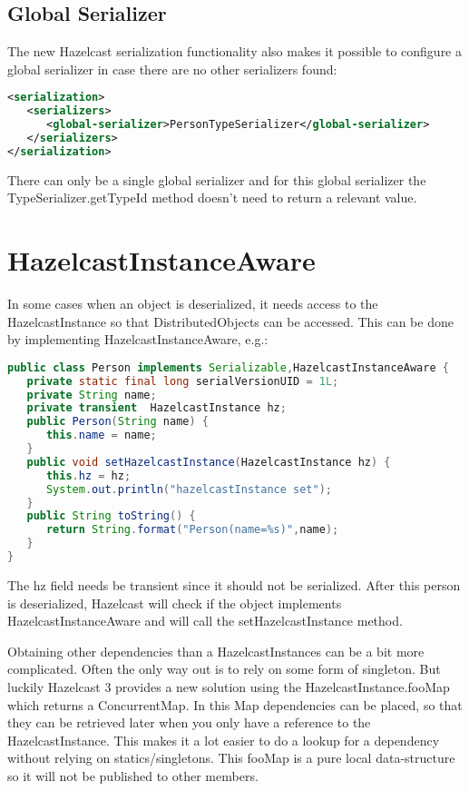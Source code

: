 \subsection{Global Serializer}
The new Hazelcast serialization functionality also makes it possible to configure a global serializer in case there are no other serializers found:
\begin{lstlisting}[language=xml]
<serialization>
   <serializers>
      <global-serializer>PersonTypeSerializer</global-serializer>
   </serializers>
</serialization>
\end{lstlisting}
There can only be a single global serializer and for this global serializer the TypeSerializer.getTypeId method doesn't need to return a relevant value.

\section{HazelcastInstanceAware}
In some cases when an object is deserialized, it needs access to the HazelcastInstance so that DistributedObjects can be accessed. This can be done by implementing HazelcastInstanceAware, e.g.:
\begin{lstlisting}[language=java]
public class Person implements Serializable,HazelcastInstanceAware {
   private static final long serialVersionUID = 1L;
   private String name;
   private transient  HazelcastInstance hz;
   public Person(String name) {
      this.name = name;
   }
   public void setHazelcastInstance(HazelcastInstance hz) {
      this.hz = hz;
      System.out.println("hazelcastInstance set");
   }
   public String toString() {
      return String.format("Person(name=%s)",name);
   }
}
\end{lstlisting}
The hz field needs be transient since it should not be serialized. After this person is deserialized, Hazelcast will check if the object implements HazelcastInstanceAware and will call the setHazelcastInstance method.

Obtaining other dependencies than a HazelcastInstances can be a bit more complicated. Often the only way out is to rely on some form of singleton. But luckily Hazelcast 3 provides a new solution using the HazelcastInstance.fooMap which returns a ConcurrentMap. In this Map dependencies can be placed, so that they can be retrieved later when you only have a reference to the HazelcastInstance. This makes it a lot easier to do a lookup for a dependency without relying on statics/singletons. This fooMap is a pure local data-structure so it will not be published to other members.


